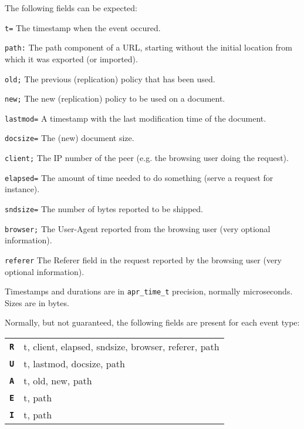 \documentclass[10pt,a4paper]{article}
\makeatletter
\newenvironment{p}{\@open{P}{}}{\@close{P}}
\newenvironment{p}{}{\par}
\makeatother
\begin{document}
\begin{p}
The following fields can be expected:
\begin{description}
\item{\texttt{t=}} The timestamp when the event occured.
\item{\texttt{path:}} The path component of a URL, starting without the initial
location from which it was exported (or imported).
\item{\texttt{old;}} The previous (replication) policy that has been used.
\item{\texttt{new;}} The new (replication) policy to be used on a document.
\item{\texttt{lastmod=}} A timestamp with the last modification time of the
  document.
\item{\texttt{docsize=}} The (new) document size.
\item{\texttt{client;}} The IP number of the peer (e.g. the browsing user doing
  the request).
\item{\texttt{elapsed=}} The amount of time needed to do something (serve a
  request for instance).
\item{\texttt{sndsize=}} The number of bytes reported to be shipped.
\item{\texttt{browser;}} The User-Agent reported from the browsing user (very
  optional information).
\item{\texttt{referer}} The Referer field in the request reported by the
  browsing user (very optional information).
\end{description}
\end{p}

\begin{p}
Timestamps and durations are in \verb!apr_time_t! precision, normally
microseconds.  Sizes are in bytes.
\end{p}

\begin{p}
Normally, but not guaranteed, the following fields are present for each event
type:
\begin{tabular}{|l|l|} \hline
\textbf{\texttt{R}} & t, client, elapsed, sndsize, browser, referer, path \\
\textbf{\texttt{U}} & t, lastmod, docsize, path \\
\textbf{\texttt{A}} & t, old, new, path\\
\textbf{\texttt{E}} & t, path \\
\textbf{\texttt{I}} & t, path \\ \hline
\end{tabular}
\end{p}


\newpage



~
\end{document}
